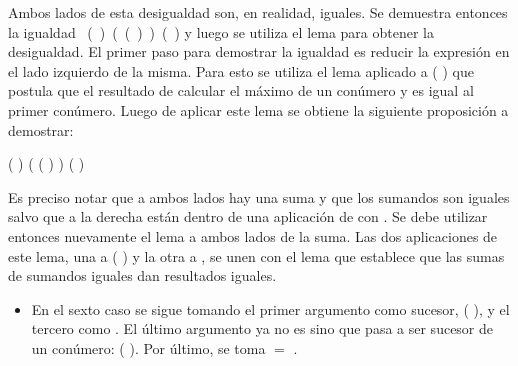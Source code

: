 \begin{AgdaAlign}
Ambos lados de esta desigualdad son, en realidad, iguales. Se demuestra entonces la igualdad \hbox{\AgdaFunction{[}  \AgdaFunction{]}  (  \AgdaFunction{+} )  \AgdaFunction{$\sim$} ( ( ) ) \AgdaFunction{+} (  )} y luego se utiliza el lema \AgdaFunction{$\sim\rightarrow\leq$} para obtener la desigualdad. El primer paso para demostrar la igualdad es reducir la expresión  en el lado izquierdo de la misma. Para esto se utiliza el lema  aplicado a (  \AgdaFunction{+} ) que postula que el resultado de calcular el máximo de un conúmero y  es igual al primer conúmero. Luego de aplicar este lema se obtiene la siguiente proposición 	a demostrar:
\begin{center}
\AgdaFunction{[}  \AgdaFunction{]} ( ) \AgdaFunction{+}  \AgdaFunction{$\sim$} ( ( ) 	) \AgdaFunction{+} (  )
\end{center}

Es preciso notar que a ambos lados hay una suma y que los sumandos son iguales salvo que a la derecha están dentro de una aplicación de  con . Se debe utilizar entonces nuevamente el lema  a ambos lados de la suma. Las dos aplicaciones de este lema, una a ( ) y la otra a , se unen con el lema  que establece que las sumas de sumandos iguales dan resultados iguales.

\begin{itemize}
\item En el sexto caso se sigue tomando el primer argumento como sucesor, ( ), y el tercero como . El último argumento ya no es  sino que pasa a ser sucesor de un conúmero: ( ). Por último, se toma  $=$ .
\end{itemize}


\end{AgdaAlign}
